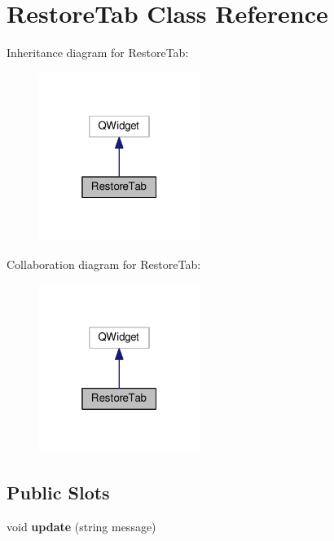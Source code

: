\hypertarget{classRestoreTab}{}\section{Restore\+Tab Class Reference}
\label{classRestoreTab}


Inheritance diagram for Restore\+Tab\+:\nopagebreak
\begin{figure}[H]
\begin{center}
\leavevmode
\includegraphics[width=148pt]{classRestoreTab__inherit__graph}
\end{center}
\end{figure}


Collaboration diagram for Restore\+Tab\+:\nopagebreak
\begin{figure}[H]
\begin{center}
\leavevmode
\includegraphics[width=148pt]{classRestoreTab__coll__graph}
\end{center}
\end{figure}
\subsection*{Public Slots}
\begin{DoxyCompactItemize}
\item 
\mbox{\label{classRestoreTab_a549e7118c5e8a28af1479a976e396963}} 
void {\bfseries update} (string message)
\end{DoxyCompactItemize}
